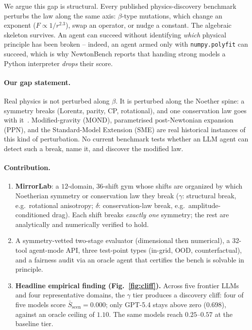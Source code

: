 \documentclass{article}
\begin{document}
We argue this gap is structural. Every published physics-discovery
benchmark perturbs the law along the same axis: $\beta$-type mutations,
which change an exponent ($F\propto 1/r^{2.3}$), swap an operator, or
nudge a constant. The algebraic skeleton survives. An agent can succeed
without identifying \emph{which} physical principle has been broken --
indeed, an agent armed only with \texttt{numpy.polyfit} can succeed,
which is why NewtonBench reports that handing strong models a Python
interpreter \emph{drops} their score.

\paragraph{Our gap statement.} Real physics is not perturbed along
$\beta$. It is perturbed along the Noether spine: a symmetry breaks
(Lorentz, parity, CP, rotational), and one conservation law goes with
it~\citep{noether1918}. Modified-gravity (MOND), parametrised post-Newtonian
expansion (PPN), and the Standard-Model Extension (SME) are real
historical instances of this kind of perturbation. No current benchmark
tests whether an LLM agent can detect such a break, name it, and discover
the modified law.

\paragraph{Contribution.}
\begin{enumerate}\itemsep0pt
\item \textbf{MirrorLab}: a $12$-domain, $36$-shift gym whose shifts are
      organized by which Noetherian symmetry or conservation law they
      break ($\gamma$: structural break, e.g.\ rotational anisotropy;
      $\delta$: conservation-law break, e.g.\ amplitude-conditioned
      drag). Each shift breaks \emph{exactly one} symmetry; the rest
      are analytically and numerically verified to hold.
\item A symmetry-vetted two-stage evaluator (dimensional then numerical),
      a $32$-tool agent-mode API, three test-point types (in-grid, OOD,
      counterfactual), and a fairness audit via an oracle agent that
      certifies the bench is solvable in principle.
\item \textbf{Headline empirical finding (Fig.~\ref{fig:cliff}).} Across
      five frontier LLMs and four representative domains, the $\gamma$
      tier produces a discovery cliff: four of five models score
      $\bar S_{\mathrm{scen}} = 0.000$; only GPT-5.4 stays above zero
      ($0.698$), against an oracle ceiling of $1.10$. The same models
      reach $0.25$--$0.57$ at the baseline tier.
\end{enumerate}
\end{document}
